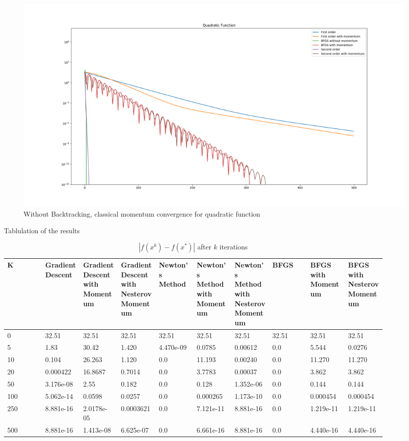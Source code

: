 \documentclass{article}
\begin{document}
\begin{figure}[H]
	\includegraphics[width=\linewidth]{../Images/quadraticmomentum1.png}
	\caption{Without Backtracking, classical momentum convergence for quadratic function}
	\label{fig:Without Backtracking, classical momentum convergence for quadratic function}
\end{figure}

Tablulation of the results

\begin{table}[H]
	\centering
	\caption{$ | f(x^k) - f(x^*) | $ after $k$ iterations}
	\label{Quadratic function table}
	\begin{tabular}{|l|p{0.1\linewidth}|p{0.1\linewidth}|p{0.1\linewidth}|p{0.1\linewidth}|p{0.1\linewidth}|p{0.1\linewidth}|p{0.1\linewidth}|p{0.1\linewidth}|p{0.1\linewidth}|}
		\hline
		K & Gradient Descent & Gradient Descent with Momentum & Gradient Descent with Nesterov Momentum & Newton's Method & Newton's Method with Momentum & Newton's Method with Nesterov Momentum & BFGS & BFGS with Momentum & BFGS with Nesterov Momentum \\
		\hline
		0 & 32.51 & 32.51 & 32.51 & 32.51 & 32.51 & 32.51 & 32.51 & 32.51 & 32.51 \\
		\hline
		5 & 1.83 & 30.42 & 1.420 & 4.470e-09 & 0.0785 & 0.00612 & 0.0 & 5.544 & 0.0276 \\
		\hline
		10 & 0.104 & 26.263 & 1.120 & 0.0 & 11.193 & 0.00240 & 0.0 & 11.270 & 11.270 \\
		\hline
		20 & 0.000422 & 16.8687 & 0.7014 & 0.0 & 3.7783 & 0.00037 & 0.0 & 3.862 & 3.862 \\
		\hline
		50 & 3.176e-08 & 2.55 & 0.182 & 0.0 & 0.128 & 1.352e-06 & 0.0 & 0.144 & 0.144 \\
		\hline
		100 & 5.062e-14 & 0.0598 & 0.0257 & 0.0 & 0.000265 & 1.173e-10 & 0.0 & 0.000454 & 0.000454 \\
		\hline
		250 & 8.881e-16 & 2.0178e-05 & 0.0003621 & 0.0 & 7.121e-11 & 8.881e-16 & 0.0 & 1.219e-11 & 1.219e-11 \\
		\hline
		500 & 8.881e-16 & 1.413e-08 & 6.625e-07 & 0.0 & 6.661e-16 & 8.881e-16 & 0.0 & 4.440e-16 & 4.440e-16 \\
		\hline
	\end{tabular}
\end{table}
\end{document}

